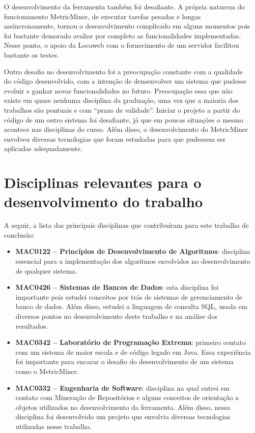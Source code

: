 \documentclass[a4paper, 12pt, twoside]{book}
\begin{document}
    O desenvolvimento da ferramenta também foi desafiante. A própria natureza do funcionamento MetricMiner, de executar tarefas pesadas e longas assíncronamente, tornou o desenvolvimento complicado em alguns momentos pois foi bastante demorado avaliar por completo as funcionalidades implementadas. Nesse ponto, o apoio da Locaweb com o fornecimento de um servidor facilitou bastante os testes.

    Outro desafio no desenvolvimento foi a preocupação constante com a qualidade do código desenvolvido, com a intenção de densenvolver um sistema que pudesse evoluir e ganhar novas funcionalidades no futuro. Preocupação essa que não existe em quase nenhuma disciplina da graduação, uma vez que a maioria dos trabalhos são pontuais e com ``prazo de validade''. Iniciar o projeto a partir do código de um outro sistema foi desafiante, já que em poucas situações o mesmo acontece nas disciplinas do curso. Além disso, o desenvolvimento do MetricMiner envolveu diversas tecnologias que foram estudadas para que pudessem ser aplicadas adequadamente.

    \section{Disciplinas relevantes para o desenvolvimento do trabalho}

    A seguir, a lista das principais disciplinas que contribuíram para este trabalho de conclusão:
    \begin{itemize}
        \item {\bf MAC0122 -- Princípios de Desenvolvimento de Algoritmos}: disciplina essencial para a implementação dos algoritmos envolvidos no desenvolvimento de qualquer sistema.
        \item {\bf MAC0426 -- Sistemas de Bancos de Dados}: esta disciplina foi importante pois estudei conceitos por trás de sistemas de gerenciamento de banco de dados. Além disso, estudei a linguagem de consulta SQL, usada em diversos pontos no desenvolvimento deste trabalho e na análise dos resultados.
        \item {\bf MAC0342 -- Laboratório de Programação Extrema}: primeiro contato com um sistema de maior escala e de código legado em Java. Essa experiência foi importante para encarar o desafio do desenvolvimento de um sistema como o MetricMiner.
        \item {\bf MAC0332 -- Engenharia de Software}: disciplina na qual entrei em contato com Mineração de Repositórios e alguns conceitos de orientação a objetos utilizados no desenvolvimento da ferramenta. Além disso, nessa disciplina foi desenvolvido um projeto que envolvia diversas tecnologias utilizadas nesse trabalho.
    \end{itemize}
\end{document}
